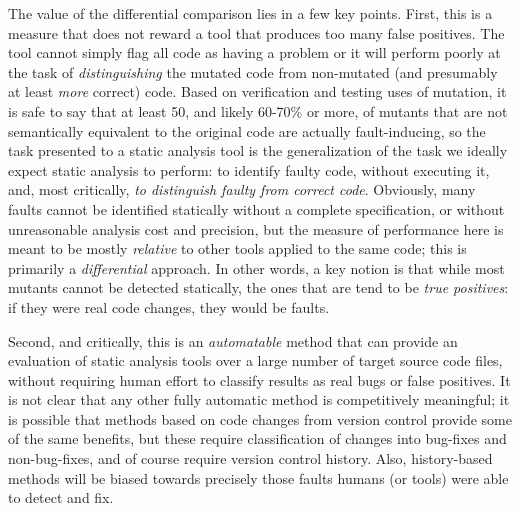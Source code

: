 The value of the differential comparison lies in a few key points.  First, this is a measure that does not reward a tool that produces too many false positives.  The tool cannot simply flag all code as having a problem or it will perform poorly at the task of \emph{distinguishing} the mutated code from non-mutated (and presumably at least \emph{more} correct) code.  Based on verification and testing uses of mutation, it is safe to say that at least 50, and likely 60-70\% or more, of mutants that are not semantically equivalent to the original code are actually fault-inducing, so the task presented to a static analysis tool is the generalization of the task we ideally expect static analysis to perform:  to identify faulty code, without executing it, and, most critically, \emph{to distinguish faulty from correct code}.  Obviously, many faults cannot be identified statically without a complete specification, or without unreasonable analysis cost and precision, but the measure of performance here is meant to be mostly \emph{relative} to other tools applied to the same code; this is primarily a \emph{differential} approach.  In other words, a key notion is that while most mutants cannot be detected statically, the ones that are tend to be \emph{true positives}: if they were real code changes, they would be faults.

Second, and critically, this is an \emph{automatable} method that can provide an evaluation of static analysis tools over a large number of target source code files, without requiring human effort to classify results as real bugs or false positives.  It is not clear that any other fully automatic method is competitively meaningful; it is possible that methods based on code changes from version control provide some of the same benefits, but these require classification of changes into bug-fixes and non-bug-fixes, and of course require version control history.  Also, history-based methods will be biased towards precisely those faults humans (or tools) were able to detect and fix.


